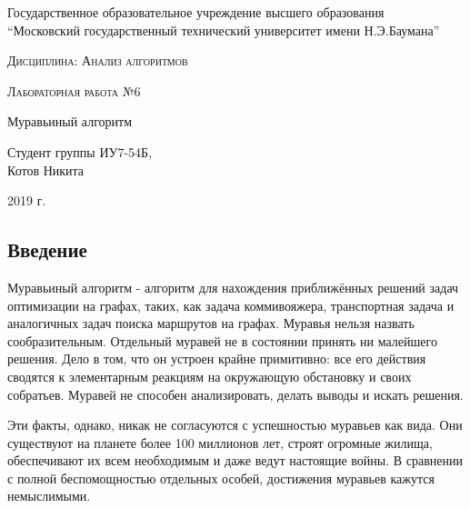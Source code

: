 \documentclass[a4paper,12pt]{article}
\begin{document}
    \begin{titlepage}
        \begin{center}
            \large
            Государственное образовательное учреждение высшего  образования\\
            “Московский государственный технический университет имени Н.Э.Баумана”
            \vspace{3cm}
            
            \textsc{Дисциплина: Анализ алгоритмов}
            \vspace{0.5cm}
                
            \textsc{Лабораторная работа №6}
            \vspace{3cm}
            
            {\LARGE Муравьиный алгоритм}
            \vspace{3cm}
            
            Студент группы ИУ7-54Б,\\   
            Котов Никита
            \vfill
            
            2019 г.            
            \end{center}
    \end{titlepage}
    
    \begin{center}
    	\tableofcontents
    \end{center}
	
	\setcounter{page}{2}
	\newpage
    \begin{center}
        \section*{Введение}
    \end{center}
        \label{sec:intro}
\quad 
Муравьиный алгоритм - алгоритм для нахождения приближённых решений задач оптимизации на графах, таких, как задача коммивояжера, транспортная задача и аналогичных задач поиска маршрутов на графах. 
Муравья нельзя назвать сообразительным. Отдельный муравей не в состоянии принять ни малейшего решения. Дело в том, что он устроен крайне примитивно: все его действия сводятся к элементарным реакциям на окружающую обстановку и своих собратьев. Муравей не способен анализировать, делать выводы и искать решения.

Эти факты, однако, никак не согласуются с успешностью муравьев как вида. Они существуют на планете более 100 миллионов лет, строят огромные жилища, обеспечивают их всем необходимым и даже ведут настоящие войны. В сравнении с полной беспомощностью отдельных особей, достижения муравьев кажутся немыслимыми.
\end{document}
